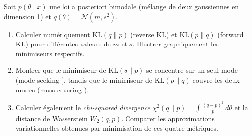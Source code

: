 \begin{exercice}
Soit $p(\theta \mid x)$ une loi a posteriori bimodale (m\'elange de deux
gaussiennes en dimension 1) et $q(\theta) = \mathcal{N}(m, s^2)$.
\begin{enumerate}
  \item Calculer num\'eriquement $\mathrm{KL}(q \| p)$ (reverse KL) et
        $\mathrm{KL}(p \| q)$ (forward KL) pour diff\'erentes valeurs
        de $m$ et $s$. Illustrer graphiquement les minimiseurs respectifs.
  \item Montrer que le minimiseur de $\mathrm{KL}(q \| p)$ se concentre
        sur un seul mode (\og mode-seeking \fg), tandis que le minimiseur
        de $\mathrm{KL}(p \| q)$ couvre les deux modes
        (\og mass-covering \fg).
  \item Calculer \'egalement le \emph{chi-squared divergence}
        $\chi^2(q \| p) = \int \frac{(q - p)^2}{p}\,d\theta$ et la
        distance de Wasserstein $W_2(q, p)$. Comparer les approximations
        variationnelles obtenues par minimisation de ces quatre m\'etriques.
\end{enumerate}
\end{exercice}
